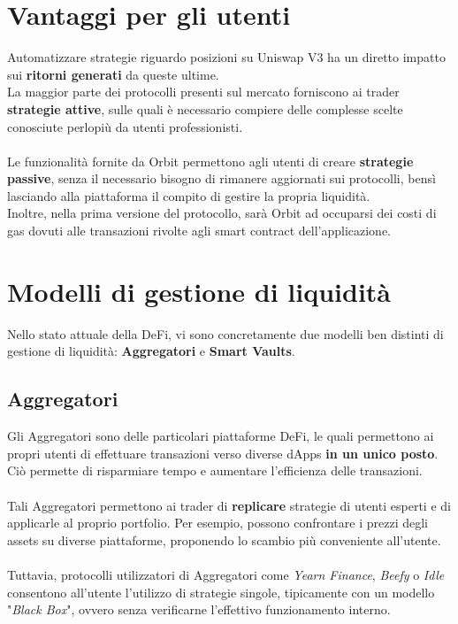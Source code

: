 \documentclass[12pt,a4paper]{report}
\begin{document}
\section{Vantaggi per gli utenti}

Automatizzare strategie riguardo posizioni su Uniswap V3 ha un diretto impatto sui \textbf{ritorni generati} da queste ultime.
\\La maggior parte dei protocolli presenti sul mercato forniscono ai trader \textbf{strategie attive}, sulle quali è necessario compiere delle complesse scelte conosciute perlopiù da utenti professionisti.
\\\\Le funzionalità fornite da Orbit permettono agli utenti di creare \textbf{strategie passive}, senza il necessario bisogno di rimanere aggiornati sui protocolli, bensì lasciando alla piattaforma il compito di gestire la propria liquidità.
\\Inoltre, nella prima versione del protocollo, sarà Orbit ad occuparsi dei costi di gas dovuti alle transazioni rivolte agli smart contract dell'applicazione.

\section{Modelli di gestione di liquidità}

Nello stato attuale della DeFi, vi sono concretamente due modelli ben distinti di gestione di liquidità:  \textbf{Aggregatori}\cite{aggregator} e  \textbf{Smart Vaults}\cite{smart_vault}.

\subsection{Aggregatori}

Gli Aggregatori sono delle particolari piattaforme DeFi, le quali permettono ai propri utenti di effettuare transazioni verso diverse dApps \textbf{in un unico posto}. Ciò permette di risparmiare tempo e aumentare l'efficienza delle transazioni.
\\\\Tali Aggregatori permettono ai trader di \textbf{replicare} strategie di utenti esperti e di applicarle al proprio portfolio. Per esempio, possono confrontare i prezzi degli assets su diverse piattaforme, proponendo lo scambio più conveniente all'utente.
\\\\Tuttavia, protocolli utilizzatori di Aggregatori come \textit{Yearn Finance}, \textit{Beefy} o \textit{Idle} consentono all'utente l'utilizzo di strategie singole, tipicamente con un modello "\textit{Black Box}", ovvero senza verificarne l'effettivo funzionamento interno.
\end{document}
